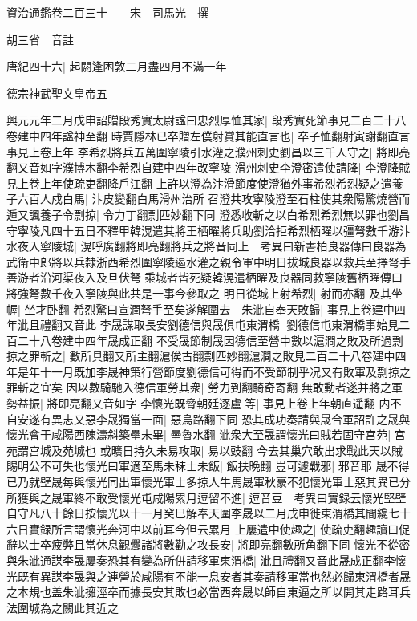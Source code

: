 資治通鑑卷二百三十　　宋　司馬光　撰

胡三省　音註

唐紀四十六|{
	起閼逢困敦二月盡四月不滿一年}


德宗神武聖文皇帝五

興元元年二月戊申詔贈段秀實太尉諡曰忠烈厚恤其家|{
	段秀實死節事見二百二十八卷建中四年諡神至翻}
時賈隱林已卒贈左僕射賞其能直言也|{
	卒子恤翻射寅謝翻直言事見上卷上年}
李希烈將兵五萬圍寧陵引水灌之濮州刺史劉昌以三千人守之|{
	將即亮翻又音如字濮博木翻李希烈自建中四年改寧陵}
滑州刺史李澄密遣使請降|{
	李澄降賊見上卷上年使疏吏翻降戶江翻}
上許以澄為汴滑節度使澄猶外事希烈希烈疑之遣養子六百人戍白馬|{
	汴皮變翻白馬滑州治所}
召澄共攻寧陵澄至石柱使其衆陽驚燒營而遁又諷養子令剽掠|{
	令力丁翻剽匹妙翻下同}
澄悉收斬之以白希烈希烈無以罪也劉昌守寧陵凡四十五日不釋甲韓滉遣其將王栖曜將兵助劉洽拒希烈栖曜以彊弩數千游汴水夜入寧陵城|{
	滉呼廣翻將即亮翻將兵之將音同上　考異曰新書柏良器傳曰良器為武衛中郎將以兵隸浙西希烈圍寧陵遏水灌之親令軍中明日拔城良器以救兵至擇弩手善游者沿河渠夜入及旦伏弩乘城者皆死疑韓滉遣栖曜及良器同救寧陵舊栖曜傳曰將強弩數千夜入寧陵與此共是一事今參取之}
明日從城上射希烈|{
	射而亦翻}
及其坐幄|{
	坐才卧翻}
希烈驚曰宣潤弩手至矣遂解圍去　朱泚自奉天敗歸|{
	事見上卷建中四年泚且禮翻又音此}
李晟謀取長安劉德信與晟俱屯東渭橋|{
	劉德信屯東渭橋事始見二百二十八卷建中四年晟成正翻}
不受晟節制晟因德信至營中數以滬澗之敗及所過剽掠之罪斬之|{
	數所具翻又所主翻滬俟古翻剽匹妙翻滬澗之敗見二百二十八卷建中四年是年十一月既加李晟神策行營節度劉德信可得而不受節制乎况又有敗軍及剽掠之罪斬之宜矣}
因以數騎馳入德信軍勞其衆|{
	勞力到翻騎奇寄翻}
無敢動者遂并將之軍勢益振|{
	將即亮翻又音如字}
李懷光既脅朝廷逐盧等|{
	事見上卷上年朝直遥翻}
内不自安遂有異志又惡李晟獨當一面|{
	惡烏路翻下同}
恐其成功奏請與晟合軍詔許之晟與懷光會于咸陽西陳濤斜築壘未畢|{
	壘魯水翻}
泚衆大至晟謂懷光曰賊若固守宫苑|{
	宫苑謂宫城及苑城也}
或曠日持久未易攻取|{
	易以豉翻}
今去其巢穴敢出求戰此天以賊賜明公不可失也懷光曰軍適至馬未秣士未飯|{
	飯扶晩翻}
豈可遽戰邪|{
	邪音耶}
晟不得已乃就壁晟每與懷光同出軍懷光軍士多掠人牛馬晟軍秋豪不犯懷光軍士惡其異已分所獲與之晟軍終不敢受懷光屯咸陽累月逗留不進|{
	逗音豆　考異曰實録云懷光堅壁自守凡八十餘日按懷光以十一月癸巳解奉天圍李晟以二月戊申徙東渭橋其間纔七十六日實録所言謂懷光奔河中以前耳今但云累月}
上屢遣中使趣之|{
	使疏吏翻趣讀曰促}
辭以士卒疲弊且當休息觀釁諸將數勸之攻長安|{
	將即亮翻數所角翻下同}
懷光不從密與朱泚通謀李晟屢奏恐其有變為所併請移軍東渭橋|{
	泚且禮翻又音此晟成正翻李懷光既有異謀李晟與之連營於咸陽有不能一息安者其奏請移軍當也然必歸東渭橋者晟之本規也盖朱泚擁涇卒而據長安其敗也必當西奔晟以師自東逼之所以開其走路耳兵法圍城為之闕此其近之}
